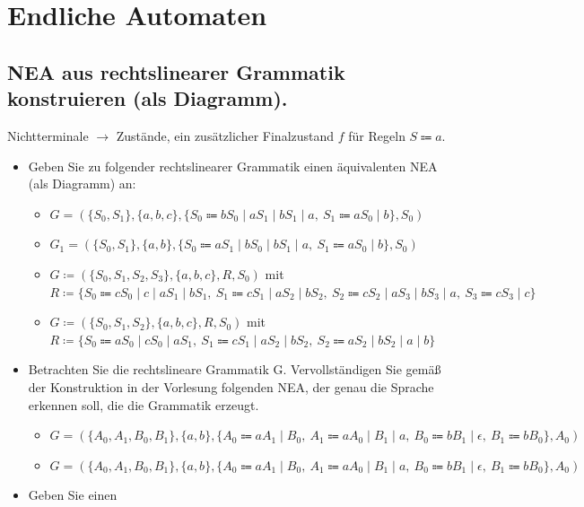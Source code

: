 \section{Endliche Automaten}\label{subsec:endliche-automaten}

\subsection{NEA aus rechtslinearer Grammatik konstruieren (als Diagramm).}%
Nichtterminale $\to$ Zustände, ein zusätzlicher Finalzustand $f$ für Regeln $S\Coloneqq a$.

\begin{itemize}
    \item Geben Sie zu folgender rechtslinearer Grammatik einen äquivalenten NEA (als Diagramm) an:
    \begin{itemize}
        \item $G=(\{S_0,S_1\},\{a,b,c\},\{S_0\Coloneqq bS_0\mid aS_1\mid bS_1\mid a,\ S_1\Coloneqq aS_0\mid b\},S_0)$ 
        \item $G_1=(\{S_0,S_1\},\{a,b\},\{S_0\Coloneqq aS_1\mid bS_0\mid bS_1\mid a,\ S_1\Coloneqq aS_0\mid b\},S_0)$ 
        \item $G\coloneqq(\{S_0,S_1,S_2,S_3\},\{a,b,c\},R,S_0)$ mit\\
        $R\coloneqq\{S_0\Coloneqq cS_0\mid c\mid aS_1\mid bS_1,\ S_1\Coloneqq cS_1\mid aS_2\mid bS_2,\ S_2\Coloneqq cS_2\mid aS_3\mid bS_3\mid a,\ S_3\Coloneqq cS_3\mid c\}$ 
        \item $G\coloneqq(\{S_0,S_1,S_2\},\{a,b,c\},R,S_0)$ mit\\
        $R\coloneqq\{S_0\Coloneqq aS_0\mid cS_0\mid aS_1,\ S_1\Coloneqq cS_1\mid aS_2\mid bS_2,\ S_2\Coloneqq aS_2\mid bS_2\mid a\mid b\}$ 
    \end{itemize}
    \item Betrachten Sie die rechtslineare Grammatik G. Vervollständigen Sie gemäß der Konstruktion in der Vorlesung
    folgenden NEA, der genau die Sprache erkennen soll, die die Grammatik erzeugt.
    \begin{itemize}
        \item $G=(\{A_0,A_1,B_0,B_1\},\{a,b\},\{A_0\Coloneqq aA_1\mid B_0,\ A_1\Coloneqq aA_0\mid B_1\mid a,\ B_0\Coloneqq bB_1\mid\epsilon,\ B_1\Coloneqq bB_0\},A_0)$ 
        \item $G=(\{A_0,A_1,B_0,B_1\},\{a,b\},\{A_0\Coloneqq aA_1\mid B_0,\ A_1\Coloneqq aA_0\mid B_1\mid a,\ B_0\Coloneqq bB_1\mid\epsilon,\ B_1\Coloneqq bB_0\},A_0)$ 
    \end{itemize}
    \item Geben Sie einen
\end{itemize}

